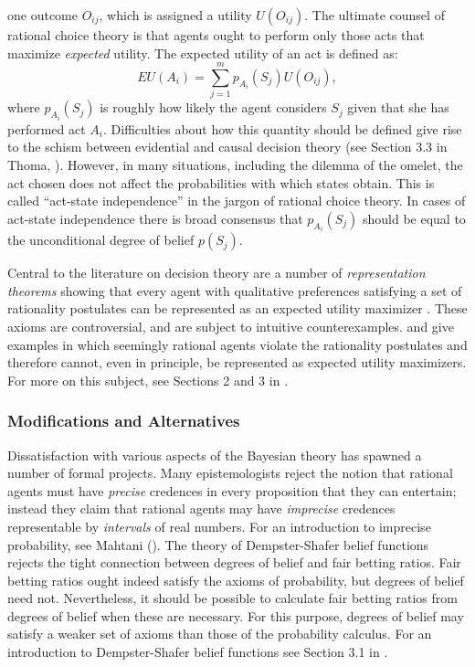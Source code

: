 one outcome $O_{ij}$, which is assigned a utility $U(O_{ij})$. The ultimate
counsel of rational choice theory is that agents ought to perform only those
acts that maximize {\em expected} utility. The expected utility of an act is
defined as:
$$ EU(A_i) = \sum_{j=1}^m p_{A_i}(S_j)U(O_{ij}),$$ where $p_{A_i}(S_j)$ is
roughly how likely the agent considers $S_j$ given that she has performed act
$A_i$. Difficulties about how this quantity should be defined give rise to the
schism between evidential and causal decision theory (see Section 3.3 in
Thoma, ). However, in many situations, including the dilemma
of the omelet, the act chosen does not affect the probabilities with which
states obtain. This is called ``act-state independence'' in the jargon of
rational choice theory. In cases of act-state independence there is broad
consensus that $p_{A_i}(S_j)$ should be equal to the unconditional degree of
belief $p(S_j)$.

Central to the literature on decision theory are a number of {\em representation
theorems} showing that every agent with qualitative preferences satisfying a set
of rationality postulates can be represented as an expected utility maximizer
\citep{vonneumann1944theory, savage1954foundations}. These axioms are
controversial, and are subject to intuitive counterexamples.
\citet{allais1953lecomportement} and \citet{ellsberg1961risk} give examples in
which seemingly rational agents violate the rationality postulates and therefore
cannot, even in principle, be represented as expected utility maximizers. For
more on this subject, see Sections 2 and 3 in
\citet{sep-rationality-normative-utility}.

\subsubsection{Modifications and Alternatives}

Dissatisfaction with various aspects of the Bayesian theory has spawned a number
of formal projects. Many epistemologists reject the notion that rational agents
must have {\em precise} credences in every proposition that they can entertain;
instead they claim that rational agents may have {\em imprecise} credences
representable by {\em intervals} of real numbers. For an introduction to
imprecise probability, see Mahtani (). The theory of
Dempster-Shafer belief functions \citep{dempster1968generalization,
shafer1976mathematical} rejects the tight connection between degrees of belief
and fair betting ratios. Fair betting ratios ought indeed satisfy the axioms of
probability, but degrees of belief need not. Nevertheless, it should be possible
to calculate fair betting ratios from degrees of belief when these are
necessary. For this purpose, degrees of belief may satisfy a weaker set of
axioms than those of the probability calculus. For an introduction to
Dempster-Shafer belief functions see Section 3.1 in \citet{sep-formal-belief}.

